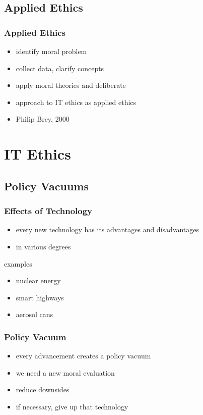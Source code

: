 \documentclass[dvipsnames]{beamer}
\begin{document}
\subsection{Applied Ethics}

\begin{frame}
  \frametitle{Applied Ethics}

  \begin{itemize}
    \item identify moral problem
    \item collect data, clarify concepts
    \item apply moral theories and deliberate

    \bigskip
    \item approach to IT ethics as applied ethics
    \item Philip Brey, 2000
  \end{itemize}
\end{frame}

\section{IT Ethics}

\subsection{Policy Vacuums}

\begin{frame}
  \frametitle{Effects of Technology}

  \begin{itemize}
    \item every new technology has its advantages and disadvantages
    \item in various degrees
  \end{itemize}

  \begin{exampleblock}{examples}
    \begin{itemize}
      \item nuclear energy
      \item smart highways
      \item aerosol cans
    \end{itemize}
  \end{exampleblock}
\end{frame}

\begin{frame}
  \frametitle{Policy Vacuum}

  \begin{itemize}
    \item every advancement creates a policy vacuum

    \bigskip
    \item we need a new moral evaluation
    \item reduce downsides
    \item if necessary, give up that technology
  \end{itemize}
\end{frame}
\end{document}

